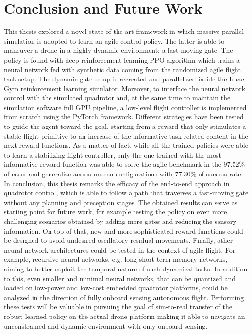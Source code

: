 \documentclass[a4paper,oneside]{book}
\theoremstyle{definition}
\begin{document}
\chapter{Conclusion and Future Work}
This thesis explored a novel state-of-the-art framework in which massive parallel simulation is adopted to learn an agile control policy. The latter is able to maneuver a
drone in a highly dynamic environment: a fast-moving gate.
The policy is found with deep reinforcement learning PPO algorithm which trains
a neural network fed with synthetic data coming from the randomized agile flight task
setup. The dynamic gate setup is recreated and parallelized inside the Isaac Gym
reinforcement learning simulator. Moreover, to interface the neural network control
with the simulated quadrotor and, at the same time to maintain the simulation software
full GPU pipeline, a low-level flight controller is implemented from scratch using the
PyTorch framework. Different strategies have been tested to guide the agent toward the
goal, starting from a reward that only stimulates a stable flight primitive to an increase
of the informative task-related content in the next reward functions. As a matter of
fact, while all the trained policies were able to learn a stabilizing flight controller, only
the one trained with the most informative reward function was able to solve the agile
benchmark in the 97.52\% of cases and generalize across unseen configurations with
77.30\% of success rate.
In conclusion, this thesis remarks the efficacy of the end-to-end approach in quadrotor control, which is able to follow a path that traverses a fast-moving gate without
any planning and preception stages. The obtained results can serve as starting point
for future work, for example testing the policy on even more challenging scenarios obtained by adding more gates and reducing the sensory information. On top of that,
new and more sophisticated reward functions could be designed to avoid undesired
oscillatory residual movements. Finally, other neural network architectures could be
tested in the context of agile flight. For example, recursive neural networks, e.g. long
short-term memory networks, aiming to better exploit the temporal nature of such
dynamical tasks. In addition to this, even smaller and minimal neural networks, that
can be quantized and loaded on low-power and low-cost embedded quadrotor platforms, could be analyzed in the direction of fully onboard sensing autonomous flight.
Performing these tests will be valuable in pursuing the goal of sim-to-real transfer of
the robust learned policy on the actual drone platform making it able to navigate an
unconstrained and dynamic environment with only onboard sensing.



\end{document}
